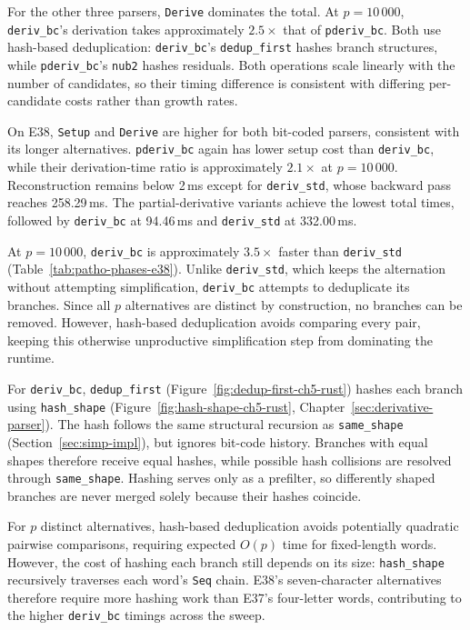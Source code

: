 For the other three parsers, \texttt{Derive}
dominates the total.
At $p=10\,000$, \texttt{deriv\_bc}'s
derivation takes approximately $2.5\times$
that of \texttt{pderiv\_bc}.
Both use hash-based deduplication:
\texttt{deriv\_bc}'s \texttt{dedup\_first}
hashes branch structures, while
\texttt{pderiv\_bc}'s \texttt{nub2}
hashes residuals.
Both operations scale linearly with the
number of candidates, so their timing
difference is consistent with differing
per-candidate costs rather than growth rates.

On E38, \texttt{Setup} and \texttt{Derive}
are higher for both bit-coded parsers,
consistent with its longer alternatives.
\texttt{pderiv\_bc} again has lower setup
cost than \texttt{deriv\_bc}, while their
derivation-time ratio is approximately
$2.1\times$ at $p=10\,000$.
Reconstruction remains below 2\,ms
except for \texttt{deriv\_std},
whose backward pass reaches 258.29\,ms.
The partial-derivative variants achieve
the lowest total times, followed by
\texttt{deriv\_bc} at 94.46\,ms and
\texttt{deriv\_std} at 332.00\,ms.

%
%
%

At $p=10\,000$, \texttt{deriv\_bc} is approximately
$3.5\times$ faster than \texttt{deriv\_std}
(Table~\ref{tab:patho-phases-e38}).
Unlike \texttt{deriv\_std}, which keeps the
alternation without attempting simplification,
\texttt{deriv\_bc} attempts to deduplicate its branches.
Since all $p$ alternatives are distinct by construction,
no branches can be removed.
However, hash-based deduplication avoids comparing
every pair, keeping this otherwise unproductive
simplification step from dominating the runtime.

For \texttt{deriv\_bc}, \texttt{dedup\_first}
(Figure~\ref{fig:dedup-first-ch5-rust})
hashes each branch using \texttt{hash\_shape}
(Figure~\ref{fig:hash-shape-ch5-rust},
Chapter~\ref{sec:derivative-parser}).
The hash follows the same structural recursion
as \texttt{same\_shape} (Section~\ref{sec:simp-impl}),
but ignores bit-code history.
Branches with equal shapes therefore receive
equal hashes, while possible hash collisions
are resolved through \texttt{same\_shape}.
Hashing serves only as a prefilter, so
differently shaped branches are never merged
solely because their hashes coincide.

For $p$ distinct alternatives, hash-based
deduplication avoids potentially quadratic
pairwise comparisons, requiring expected
$O(p)$ time for fixed-length words.
However, the cost of hashing each branch
still depends on its size:
\texttt{hash\_shape} recursively traverses
each word's \texttt{Seq} chain.
E38's seven-character alternatives therefore
require more hashing work than E37's
four-letter words, contributing to the higher
\texttt{deriv\_bc} timings across the sweep.

